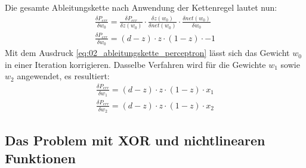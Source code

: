 Die gesamte Ableitungskette nach Anwendung der Kettenregel lautet nun:
\begin{align}
    \frac{\delta P_{err}}{\delta w_0} = \frac{\delta P_{err}}{\delta z(w_0)} \cdot \frac{\delta z(w_0)}{\delta net(w_0)} \cdot \frac{\delta net(w_0)}{\delta w_0}\\
    \frac{\delta P_{err}}{\delta w_0} = (d - z) \cdot z \cdot (1 - z) \cdot -1\label{eq:02_ableitungskette_perceptron}
\end{align}
Mit dem Ausdruck \ref{eq:02_ableitungskette_perceptron} lässt sich das Gewicht $w_0$ in einer Iteration korrigieren.
Dasselbe Verfahren wird für die Gewichte $w_1$ sowie $w_2$ angewendet, es resultiert:
\begin{align}
    \frac{\delta P_{err}}{\delta w_1} = (d - z) \cdot z \cdot (1 - z) \cdot x_1\\
    \frac{\delta P_{err}}{\delta w_2} = (d - z) \cdot z \cdot (1 - z) \cdot x_2
\end{align}

\subsection{Das Problem mit XOR und nichtlinearen Funktionen}